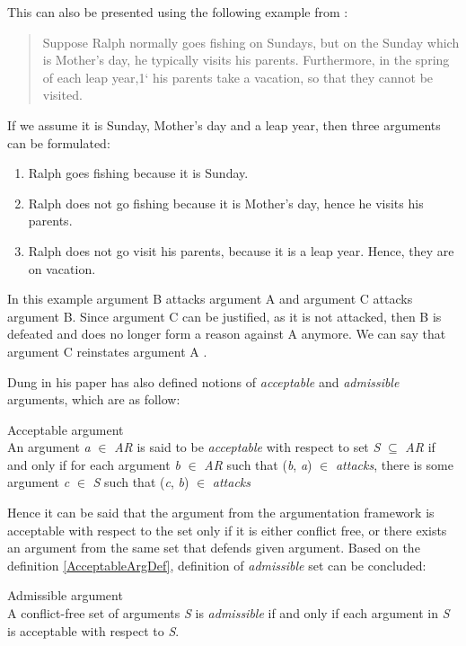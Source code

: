 This can also be presented using the following example from \citet{konolige1988defeasible}:
\begin{quote}
Suppose Ralph normally goes fishing on Sundays, but on the Sunday which is
Mother’s day, he typically visits his parents. Furthermore, in the spring of each
leap year,1` his parents take a vacation, so that they cannot be visited.
\end{quote}
If we assume it is Sunday, Mother's day and a leap year, then three arguments can be formulated:
\begin{enumerate}[label=\Alph*]
	\item{Ralph goes fishing because it is Sunday.}
	\item{Ralph does not go fishing because it is Mother's day, hence he visits his parents.}
	\item{Ralph does not go visit his parents, because it is a leap year. Hence, they are on vacation.}
\end{enumerate}
In this example argument B attacks argument A and argument C attacks argument B. Since argument C can be justified, as it is not attacked, then B is defeated and does no longer form a reason against A anymore. We can say that argument C reinstates argument A \citep{caminada2004sake}.


Dung in his paper \citep{dung1995} has also defined notions of \textit{acceptable} and \textit{admissible} arguments, which are as follow:

\begin{definition}{Acceptable argument}
\label{AcceptableArgDef}\\
An argument \textit{a} $\in$ \textit{AR} is said to be \textit{acceptable} with respect to set \textit{S} $\subseteq$ \textit{AR} if and only if for each argument \textit{b} $\in$ \textit{AR} such that (\textit{b}, \textit{a}) $\in$ \textit{attacks}, there is some argument \textit{c} $\in$ \textit{S} such that (\textit{c}, \textit{b}) $\in$ \textit{attacks}
\end{definition}

Hence it can be said that the argument from the argumentation framework is acceptable with respect to the set only if it is either conflict free, or there exists an argument from the same set that defends given argument. Based on the definition \ref{AcceptableArgDef}, definition of \textit{admissible} set can be concluded:

\begin{definition}{Admissible argument}
\label{AdmissibleArgDef}\\
A conflict-free set of arguments \textit{S} is \textit{admissible} if and only if each argument in \textit{S} is acceptable with respect to \textit{S}.
\end{definition}

